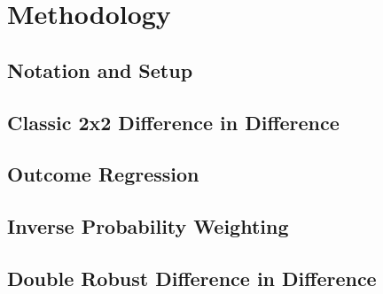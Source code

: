 \section{Methodology}

\subsection{Notation and Setup}



\subsection{Classic 2x2 Difference in Difference}




\subsection{Outcome Regression}



\subsection{Inverse Probability Weighting}


\subsection{Double Robust Difference in Difference}
